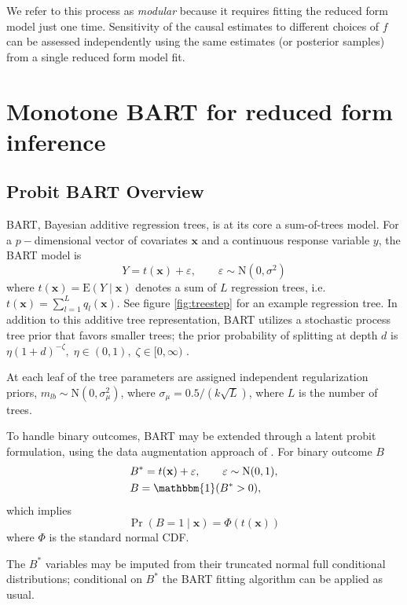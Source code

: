 \documentclass[aoas,preprint, 11pt, dvipsnames, table, x11name]{imsart}
\newcommand{\E}{\mbox{E}}
\newcommand{\N}{\mbox{N}}
\renewcommand{\bm}[1]{\mathbf{#1}}
\theoremstyle{remark}
\begin{document}
We refer to this process as {\em modular} because it requires fitting the reduced form model just one time. Sensitivity of the causal estimates to different choices of $f$ can be assessed independently using the same estimates (or posterior samples) from a single reduced form model fit.




\section{Monotone BART for reduced form inference}
\subsection{Probit BART Overview}
	BART, Bayesian additive regression trees, is at its core a sum-of-trees model. For a $p-$dimensional vector of covariates $\bm{x}$ and a continuous response variable $y$, the BART model is 
	\begin{equation}
	Y=t(\bm{x})+\varepsilon, \qquad \varepsilon\sim \N(0, \sigma^2)
	\label{bart_setup}
	\end{equation}
	where $t(\bm{x})=\E(Y\mid \bm{x})$ denotes a sum of $L$ regression trees, i.e. $t(\bm{x})=\sum_{l=1}^{L} q_l(\bm{x})$. See figure \ref{fig:treestep} for an example regression tree.  In addition to this additive tree representation, BART utilizes a stochastic process tree prior that favors smaller trees; the prior probability of splitting at depth $d$ is $\eta(1+d)^{-\zeta}, \; \eta\in (0,1), \; \zeta\in[0, \infty)$ \citep{Chipman-1998}.    

	At each leaf of the tree parameters are assigned independent regularization priors, $m_{lb}\sim  \N(0, \sigma_{\mu}^2)$, where $\sigma_{\mu}=0.5/(k\sqrt{L})$, where $L$ is the number of trees. 
	
	To handle binary outcomes, BART may be extended through a latent probit formulation, using the data augmentation approach of \cite{Albert-1993}. For binary outcome $B$ 
	\begin{align*}
	&B^*=t(\bm{x})+\varepsilon, \qquad \varepsilon\sim \N(0,1),\\
	&B=\mathbbm{1}(B^*>0),
	\end{align*}
which implies
	\begin{equation}
	\Pr(B=1\mid \bm{x})=\Phi(t(\bm{x}))
	\label{bart_binary}
	\end{equation}
	where $\Phi$ is the standard normal CDF.  

		The $B^*$ variables may be imputed from their truncated normal full conditional distributions; conditional on $B^*$ the BART fitting algorithm can be applied as usual.
	
\end{document}
